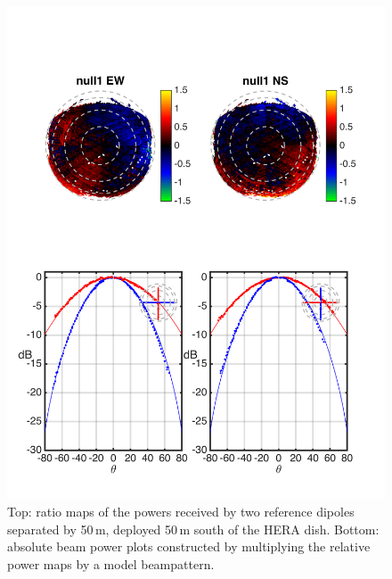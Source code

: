 \documentclass[preprint]{aastex}
\begin{document}
\begin{figure}[h]
\includegraphics[width=6.5in]{null1_rel.png}
\caption{Top: ratio maps of the powers received by two reference dipoles separated by 50\,m, deployed 50\,m south of the HERA dish. Bottom: absolute beam power plots constructed by multiplying the relative power maps by a model beampattern. }
\label{fig:null1}
\end{figure}
\end{document}
